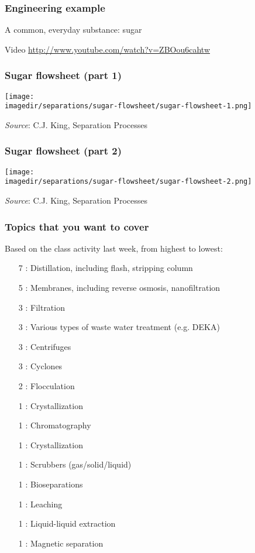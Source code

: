 \begin{frame}\frametitle{Engineering example}
	A common, everyday substance: sugar 

	\vspace{36pt}
	Video \href{http://www.youtube.com/watch?v=ZBOou6cahtw}{http://www.youtube.com/watch?v=ZBOou6cahtw}
\end{frame}

\begin{frame}\frametitle{Sugar flowsheet (part 1)}
	\begin{center}
		\texttt{[image: \\imagedir/separations/sugar-flowsheet/sugar-flowsheet-1.png]}
	\end{center}
	\emph{Source}: C.J. King, Separation Processes
\end{frame}

\begin{frame}\frametitle{Sugar flowsheet (part 2)}
	\begin{center}
		\texttt{[image: \\imagedir/separations/sugar-flowsheet/sugar-flowsheet-2.png]}
	\end{center}
	\emph{Source}: C.J. King, Separation Processes
\end{frame}

\begin{frame}\frametitle{Topics that you want to cover}
	Based on the class activity last week, from highest to lowest:
	\begin{itemize}
		\item	[7]: Distillation, including flash, stripping column
		\item	[5]: Membranes, including reverse osmosis, nanofiltration
		\item	[3]: Filtration 
		\item	[3]: Various types of waste water treatment (e.g. DEKA)
		\item	[3]: Centrifuges
		\item	[3]: Cyclones
		\item	[2]: Flocculation
		\item	[1]: Crystallization
		\item	[1]: Chromatography
		\item	[1]: Crystallization
		\item	[1]: Scrubbers (gas/solid/liquid)
		\item	[1]: Bioseparations
		\item	[1]: Leaching
		\item	[1]: Liquid-liquid extraction
		\item	[1]: Magnetic separation
	\end{itemize}
\end{frame}

